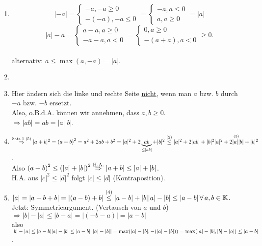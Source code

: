 \documentclass[../ana1.tex]{subfiles}
\begin{document}
\begin{bew}\leavevmode
	\begin{enumerate}
		\item 
		\[|-a| =
		\begin{cases}
			-a, -a \geq 0 \\
			-(-a), -a \leq 0
		\end{cases}
		= \begin{cases}
			-a, a \leq 0 \\
			a, a \geq 0
		\end{cases}
		= |a|\]
		\[|a| - a =
			\begin{cases}
				a-a,a\geq 0 \\
				-a-a, a<0
			\end{cases}
			= \begin{cases}
				0, a \geq 0 \\
				-(a+a), a<0
			\end{cases} \geq 0.\] \\
		alternativ: \(a \leq \max(a, -a) = \left|a\right|\).
		\item
		\item Hier ändern sich die linke und rechte Seite \underline{nicht}, wenn man \(a\) bzw. \(b\) durch \(-a\) bzw. \(-b\) ersetzt.\\
		      Also, o.B.d.A. können wir annehmen, dass \(a,b \geq 0\).\\
		      \(\Rightarrow |ab| = ab = |a||b|\).
		\item \(\overset{\text{Satz 1 (5)}}{\Rightarrow} |a+b|^2 = {(a+b)}^2=a^2+2ab+b^2=|a|^2 + 2\underbrace{ab}_{\leq |ab|} + |b|^2\\
			\overset{\text{(2)}}{\leq} |a|^2 + 2|ab| + |b|^2\\
			\overset{\text{(3)}}{|a|^2 + 2|a||b| + |b|^2}\).\\
			Also \({(a+b)}^2 \leq {(|a| + | b|)}^2\\
			\overset{\text{H.A.}}{\Rightarrow}|a+b| \leq |a|+|b|\).\\
			H.A. aus \(|c|^2 \leq |d|^2\) folgt \(|c| \leq |d|\) (Kontraposition).
		\item \(|a| = |a-b+b| = |(a-b) + b| \overset{\text{(4)}}{\leq} |a-b| + |b|\\
			|a|-|b|\leq |a-b| \, \forall \, a,b\in \mathbb{K} \).\\
			Jetzt: Symmetrieargument. (Vertausch von \(a\) und \(b\)) \\
			\(\Rightarrow |b| - |a| \leq |b-a| = |{(-b-a)}| = |a-b|\) \\
			also \(|b|-|a| \leq |a-b|\\
			|a|-|b| \leq |a-b|\\
			\left| |a|-|b|\right| = \max(|a|-|b|, - (|a|-|b|)) =\max(|a|-|b|, |b|-|a|) \leq |a-b|\).
	\end{enumerate}
\end{bew}
\end{document}
